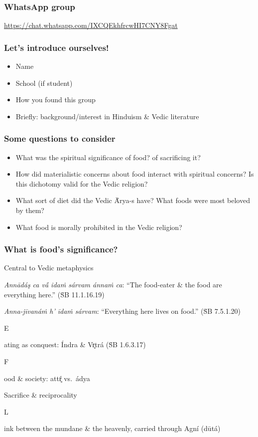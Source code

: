 \documentclass[pdf]{beamer}
\newcommand{\Subitem}[1]{{\setlength\itemindent{12pt} \item[-] #1}}
\newcommand{\Subsubitem}[1]{{\setlength\itemindent{24pt} \item[○] #1}}
\begin{document}
\begin{frame} \frametitle{WhatsApp group}
\begin{center}
	\href{https://chat.whatsapp.com/IXCQEkhfrcwHI7CNY8Fgat}{https://chat.whatsapp.com/IXCQEkhfrcwHI7CNY8Fgat}
\end{center}
\end{frame}

\begin{frame} \frametitle{Let's introduce ourselves!}
\begin{itemize}
	\item Name
	\item School (if student)
	\item How you found this group
	\item Briefly: background/interest in Hinduism \& Vedic literature
\end{itemize}
\end{frame}

\begin{frame}[label=questions] \frametitle{Some questions to consider}
\begin{itemize}
	\item What was the spiritual significance of food? of sacrificing it?
	\item How did materialistic concerns about food interact with spiritual concerns? Is this dichotomy valid for the Vedic religion?
	\item What sort of diet did the Vedic Ā́rya-s have? What foods were most beloved by them?
	\item What food is morally prohibited in the Vedic religion?
\end{itemize}
\end{frame}

\begin{frame} \frametitle{What is food's significance?}
\begin{itemize}
	\item Central to Vedic metaphysics
	\Subitem {\textit{Annādáş ca vā́ idaṁ sárvam ánnaṁ ca}: ``The food-eater \& the food are everything here.'' (ṠB 11.1.16.19)}
	\Subitem {\textit{Anna-jīvanáṁ h' īdaṁ sárvam}: ``Everything here lives on food.'' (ṠB 7.5.1.20)}
	\Subitem Eating as conquest: Índra \& Vr̥trá (ṠB 1.6.3.17)
	\Subsubitem Food \& society: attŕ̥ vs.~ádya
	\item Sacrifice \& reciprocality
	\Subitem Link between the mundane \& the heavenly, carried through Agní (dūtá)
\end{itemize}
\end{frame}
\end{document}
